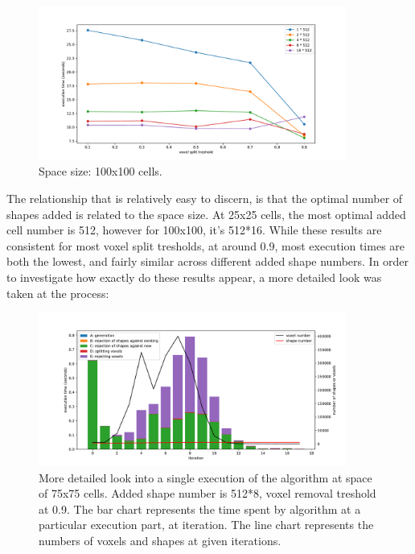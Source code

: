 \documentclass[12pt, oneside]{report}
\begin{document}
\begin{figure}[H]
  \centering
	\includegraphics[width=0.9\textwidth,keepaspectratio]{Images/SummaryOptimisation/results_100.pdf}
	\caption{Space size: 100x100 cells.}
	\label{summary_res100}
\end{figure}

The relationship that is relatively easy to discern, is that the optimal number of shapes added is related to the space size. At 25x25 cells, the most optimal added cell number is 512, however for 100x100, it's 512*16. While these results are consistent for most voxel split tresholds, at around 0.9, most execution times are both the lowest, and fairly similar across different added shape numbers. In order to investigate how exactly do these results appear, a more detailed look was taken at the process:

\begin{figure}[H]
  \centering
	\includegraphics[width=0.9\textwidth,keepaspectratio]{Images/SummaryOptimisation/iter_75_512x8_09.pdf}
	\caption{More detailed look into a single execution of the algorithm at space of 75x75 cells. Added shape number is 512*8, voxel removal treshold at 0.9. The bar chart represents the time spent by algorithm at a particular execution part, at iteration. The line chart represents the numbers of voxels and shapes at given iterations.}
	\label{summary_detail_75_512x8_09}
\end{figure}
\end{document}
